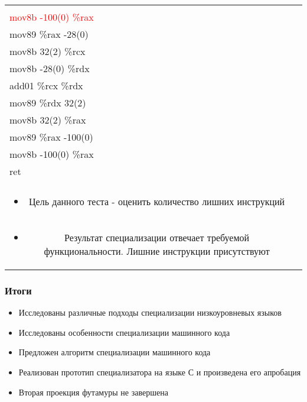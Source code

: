 \documentclass{beamer}
\begin{document}
\begin{frame}[fragile]
\begin{tabular}{l  c  r}
{\begin{minipage}[c]{0.4\textwidth}
{\textcolor{red}{mov89 \%rax  -100(0)}\\ 
\textcolor{red}{mov8b -100(0)  \%rax}\\ 
\textcolor{ao}{mov89 \%rax  -28(0)}\\ 
\textcolor{ao}{mov8b 32(2)  \%rcx}\\ 
\textcolor{ao}{mov8b -28(0)  \%rdx}\\ 
\textcolor{ao}{add01 \%rcx  \%rdx}\\ 
\textcolor{ao}{mov89 \%rdx  32(2)}\\ 
mov8b 32(2)  \%rax \\
mov89 \%rax  -100(0)\\ 
mov8b -100(0)  \%rax \\
ret\\
}
\vspace*{20mm}
\end{minipage}
}\\
 \multicolumn{2}{c}{
\begin{minipage}[c]{0.7\textwidth}
\begin{itemize}
\vfill
\item Цель данного теста - 
оценить количество лишних инструкций
\vspace*{5mm}
\end{itemize}
\end{minipage}}
 & \\
\multicolumn{2}{c}{
\begin{minipage}[c]{0.7\textwidth}
\begin{itemize}
\vfill
\item Результат специализации отвечает требуемой функциональности. Лишние инструкции присутствуют
\end{itemize}
\end{minipage}}  & \\
\end{tabular}
\vfill
\end{frame}


\begin{frame}\frametitle{Итоги}
\begin{itemize}
\item Исследованы различные подходы специализации низкоуровневых языков
\vfill
\item Исследованы особенности специализации машинного кода
\vfill
\item Предложен алгоритм специализации машинного кода
\vfill
\item Реализован прототип специализатора на языке С и произведена его апробация
\vfill
\item Вторая проекция футамуры не завершена
\end{itemize}
\end{frame}
\end{document}
